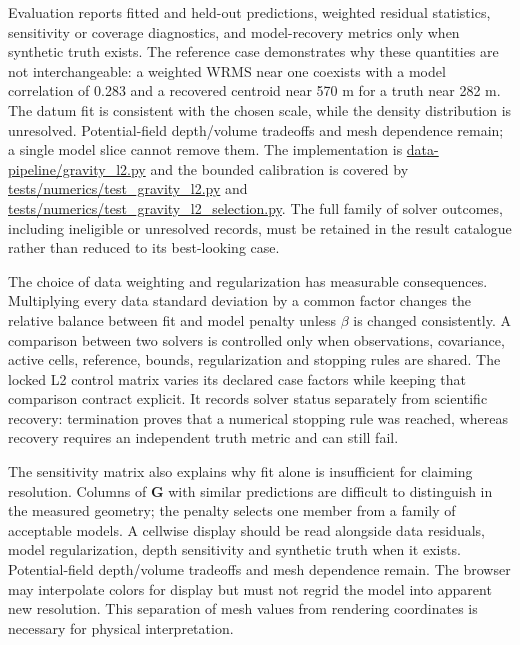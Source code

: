 Evaluation reports fitted and held-out predictions, weighted residual
statistics, sensitivity or coverage diagnostics, and model-recovery
metrics only when synthetic truth exists. The reference case
demonstrates why these quantities are not interchangeable: a weighted
WRMS near one coexists with a model correlation of 0.283 and a recovered
centroid near 570 m for a truth near 282 m. The datum fit is consistent
with the chosen scale, while the density distribution is unresolved.
Potential-field depth/volume tradeoffs and mesh dependence remain; a
single model slice cannot remove them. The implementation is
\url{data-pipeline/gravity_l2.py} and the bounded calibration is covered
by \url{tests/numerics/test_gravity_l2.py} and
\url{tests/numerics/test_gravity_l2_selection.py}. The full family of
solver outcomes, including ineligible or unresolved records, must be
retained in the result catalogue rather than reduced to its best-looking
case.

The choice of data weighting and regularization has measurable
consequences. Multiplying every data standard deviation by a common
factor changes the relative balance between fit and model penalty unless
$\beta$ is changed consistently. A comparison between two solvers is
controlled only when observations, covariance, active cells, reference,
bounds, regularization and stopping rules are shared. The locked L2
control matrix varies its declared case factors while keeping that
comparison contract explicit. It records solver status separately
from scientific recovery: termination proves that a numerical stopping
rule was reached, whereas recovery requires an independent truth metric
and can still fail.

The sensitivity matrix also explains why fit alone is insufficient for
claiming resolution. Columns of $\mathbf{G}$ with similar predictions
are difficult to distinguish in the measured geometry; the penalty
selects one member from a family of acceptable models. A cellwise
display should be read alongside data residuals, model regularization,
depth sensitivity and synthetic truth when it exists. Potential-field
depth/volume tradeoffs and mesh dependence remain. The browser may
interpolate colors for display but must not regrid the model into
apparent new resolution. This separation of mesh values from rendering
coordinates is necessary for physical interpretation.

